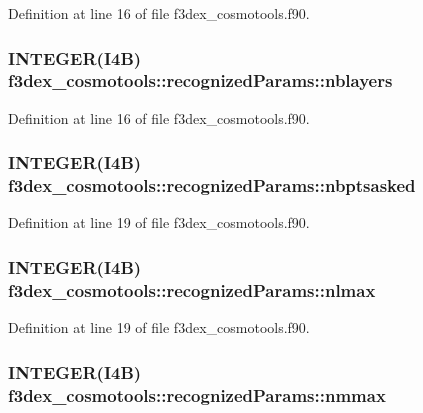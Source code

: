 Definition at line 16 of file f3dex\_\-cosmotools.f90.

\hypertarget{typef3dex__cosmotools_1_1recognized_params_a9e77c832d720a90e42f78909fe636d99}{
\subsubsection[{nblayers}]{\setlength{\rightskip}{0pt plus 5cm}INTEGER(I4B) {\bf f3dex\_\-cosmotools::recognizedParams::nblayers}}}
\label{typef3dex__cosmotools_1_1recognized_params_a9e77c832d720a90e42f78909fe636d99}


Definition at line 16 of file f3dex\_\-cosmotools.f90.

\hypertarget{typef3dex__cosmotools_1_1recognized_params_af5d0daf3a9aa22ce25fd3cf50ce976dd}{
\subsubsection[{nbptsasked}]{\setlength{\rightskip}{0pt plus 5cm}INTEGER(I4B) {\bf f3dex\_\-cosmotools::recognizedParams::nbptsasked}}}
\label{typef3dex__cosmotools_1_1recognized_params_af5d0daf3a9aa22ce25fd3cf50ce976dd}


Definition at line 19 of file f3dex\_\-cosmotools.f90.

\hypertarget{typef3dex__cosmotools_1_1recognized_params_ad9f08af96ee6a8be399f0e8d2426fabe}{
\subsubsection[{nlmax}]{\setlength{\rightskip}{0pt plus 5cm}INTEGER(I4B) {\bf f3dex\_\-cosmotools::recognizedParams::nlmax}}}
\label{typef3dex__cosmotools_1_1recognized_params_ad9f08af96ee6a8be399f0e8d2426fabe}


Definition at line 19 of file f3dex\_\-cosmotools.f90.

\hypertarget{typef3dex__cosmotools_1_1recognized_params_afc2f40d1065ec8e432d4fe57f5ec1d8d}{
\subsubsection[{nmmax}]{\setlength{\rightskip}{0pt plus 5cm}INTEGER(I4B) {\bf f3dex\_\-cosmotools::recognizedParams::nmmax}}}
\label{typef3dex__cosmotools_1_1recognized_params_afc2f40d1065ec8e432d4fe57f5ec1d8d}


